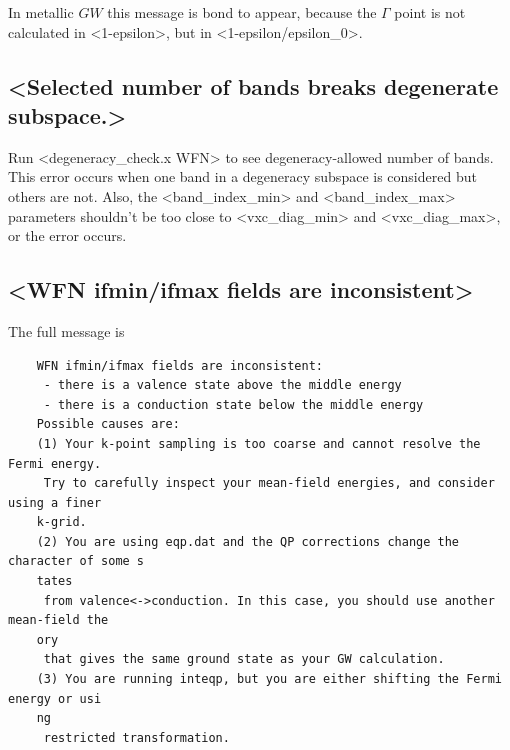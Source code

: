 \documentclass[hyperref, a4paper, 12pt]{report}
\def\texttt#1{<#1>}%
\newcommand{\shortcode}[1]{\texttt{#1}}
\begin{document}
In metallic $GW$ this message is bond to appear,
because the $\Gamma$ point is not calculated in \shortcode{1-epsilon},
but in \shortcode{1-epsilon/epsilon_0}.

\subsection{\shortcode{Selected number of bands breaks degenerate subspace.}}\label{sec:degenerate-breaking}

Run \shortcode{degeneracy_check.x WFN} to see degeneracy-allowed number of bands.
This error occurs when one band in a degeneracy subspace is considered 
but others are not.
Also, the \shortcode{band_index_min} and \shortcode{band_index_max} parameters
shouldn't be too close to \shortcode{vxc_diag_min} and \shortcode{vxc_diag_max}, 
or the error occurs.

\subsection{\shortcode{WFN ifmin/ifmax fields are inconsistent}}\label{sec:semimetal-error-1}

The full message is 
\begin{lstlisting}
    WFN ifmin/ifmax fields are inconsistent:
     - there is a valence state above the middle energy
     - there is a conduction state below the middle energy
    Possible causes are:
    (1) Your k-point sampling is too coarse and cannot resolve the Fermi energy.
     Try to carefully inspect your mean-field energies, and consider using a finer 
    k-grid.
    (2) You are using eqp.dat and the QP corrections change the character of some s
    tates
     from valence<->conduction. In this case, you should use another mean-field the
    ory
     that gives the same ground state as your GW calculation.
    (3) You are running inteqp, but you are either shifting the Fermi energy or usi
    ng 
     restricted transformation.   
\end{lstlisting}
\end{document}
